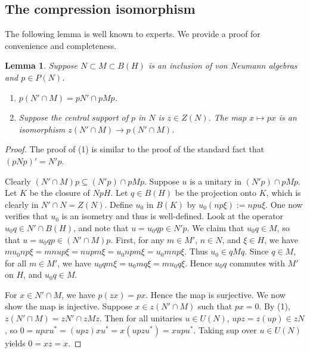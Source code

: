 \documentclass[11pt]{article}
\theoremstyle{plain}
\newtheorem{lem}[thm]{Lemma}
\theoremstyle{definition}
\begin{document}
\subsection{The compression isomorphism}
\label{sec:CompressionIso}

The following lemma is well known to experts. 
We provide a proof for convenience and completeness.

\begin{lem}
\label{lem:CompressRelativeCommutant}
Suppose $N\subset M\subset B(H)$ is an inclusion of von Neumann algebras and $p\in P(N)$.
\begin{enumerate}[label={\rm(\arabic*)}]
\item
$p(N'\cap M) = pN' \cap pMp$.
\item
Suppose the central support of $p$ in $N$ is $z\in Z(N)$.
The map $x\mapsto px$ is an isomorphism $z(N'\cap M) \to p(N'\cap M)$.
\end{enumerate}
\end{lem}
\begin{proof}
\mbox{}
\item[\underline{Proof of (1):}]
The proof of (1) is similar to the proof of the standard fact that $(pNp)' = N'p$.

Clearly $(N'\cap M)p \subseteq (N'p) \cap pMp$.
Suppose $u$ is a unitary in $(N'p) \cap pMp$.
Let $K$ be the closure of $NpH$.
Let $q\in B(H)$ be the projection onto $K$, which is clearly in $N' \cap N = Z(N)$.
Define $u_0$ in $B(K)$ by $u_0 (np\xi) := npu\xi$.
One now verifies that $u_0$ is an isometry and thus is well-defined.
Look at the operator $u_0q \in N' \cap B(H)$, and note that $u = u_0qp \in N'p$.
We claim that $u_0q \in M$, so that $u = u_0qp \in (N' \cap M)p$.
First, for any $m \in M'$, $n \in N$, and $\xi\in H$,
we have
$mu_0np\xi  = mnup\xi = nupm\xi = u_0npm\xi = u_0mnp\xi$.
Thus $u_0 \in qMq$.
Since $q \in M$, for all $m \in M'$, we have $u_0qm\xi = u_0mq\xi = mu_0q\xi$.
Hence $u_0q$ commutes with $M'$ on $H$, and $u_0q \in M$. 

\item[\underline{Proof of (2):}]
For $x\in N'\cap M$, we have $p(zx) = px$.
Hence the map is surjective.
We now show the map is injective.
Suppose $x \in z(N'\cap M)$ such that $px = 0$.
By (1), $z(N'\cap M) = zN' \cap zMz$.
Then for all unitaries $u\in U(N)$, $upz = z(up) \in zN$, so 
$0 = upxu^* = (upz)xu^* = x(upzu^*) = xupu^*$.
Taking sup over $u \in U(N)$ yields $0 = xz = x$.
\end{proof}
\end{document}
